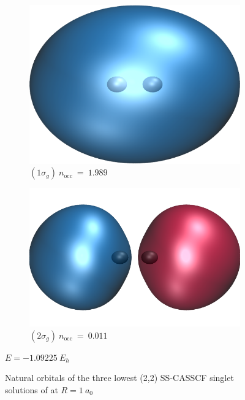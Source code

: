 \documentclass[aip,jcp,reprint,noshowkeys,superscriptaddress]{revtex4-1}
\begin{document}
\begin{figure}
  \begin{subfigure}[l]{0.45\linewidth}
    \includegraphics[width=0.75\linewidth]{Figures/h2_HF_mo1.cube.png}
    \caption*{\centering $(1\sigma_g)~n_\text{occ}~=~1.989$}
  \end{subfigure}
  \begin{subfigure}[r]{0.5\linewidth}
    \includegraphics[width=0.75\linewidth]{Figures/h2_HF_mo2.cube.png}
    \caption*{\centering $(2\sigma_g)~n_\text{occ}~=~0.011$}
  \end{subfigure}
  $E=-1.09225~E_h$
  
  \caption{Natural orbitals of the three lowest (2,2) SS-CASSCF singlet solutions of  at $R=1~a_0$ \label{fig:fig_3}}
\end{figure}
\end{document}
